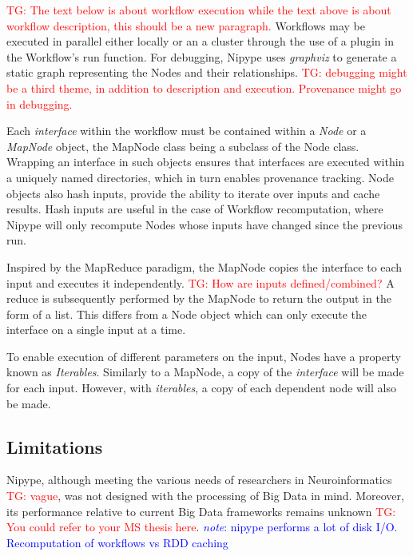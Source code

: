 \documentclass{report}
\newcommand{\note}[1]{\textcolor{blue}{\textit{note}: #1}}
\newcommand{\tristan}[1]{\textcolor{red}{TG: #1}}
\begin{document}
                \tristan{The text below is about workflow execution while the
                text above is about workflow description, this should be a new
                paragraph.}  Workflows may be executed in parallel either
                locally or an a cluster through the use of a plugin in the
                Workflow's run function. For debugging, Nipype uses
                \textit{graphviz} to generate a static graph representing the
                Nodes and their relationships. \tristan{debugging might be a
                third theme, in addition to description and execution.
                Provenance might go in debugging.}
		
         Each \textit{interface} within the workflow must be contained within a
         \textit{Node} or a \textit{MapNode} object, the MapNode class being a
         subclass of the Node class. Wrapping an interface in such objects
         ensures that interfaces are executed within a uniquely named
         directories, which in turn enables provenance tracking. Node objects
         also hash inputs, provide the ability to iterate over inputs and cache
         results. Hash inputs are useful in the case of Workflow recomputation,
         where Nipype will only recompute Nodes whose inputs have changed since
         the previous run.
		
        Inspired by the MapReduce paradigm, the MapNode copies the interface to
        each input and executes it independently. \tristan{How are inputs
        defined/combined?} A reduce is subsequently performed by the MapNode to
        return the output in the form of a list. This differs from a Node object
        which can only execute the interface on a single input at a time.
		
        To enable execution of different parameters on the input, Nodes have a
        property known as \textit{Iterables}. Similarly to a MapNode, a copy of
        the \textit{interface} will be made for each input. However, with
        \textit{iterables}, a copy of each dependent node will also be made.
		 
        \subsection{Limitations} Nipype, although meeting the various needs of
        researchers in Neuroinformatics \tristan{vague}, was not designed with
        the processing of Big Data in mind. Moreover, its performance relative
        to current Big Data frameworks remains unknown \tristan{You could refer
        to your MS thesis here}.  \note{nipype performs a lot of disk I/O.
        Recomputation of workflows vs RDD caching}
		
\end{document}
